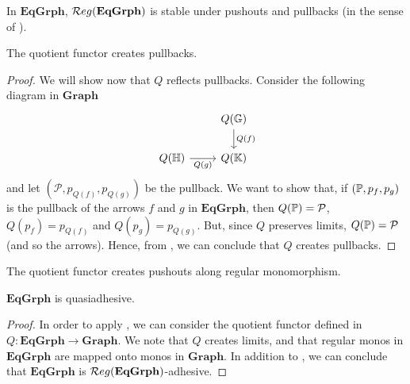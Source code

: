 \begin{lemma}\label{lemma:eqgrph_stab_po_pb}
    In $\mathbf{EqGrph}$,  $\mathcal{R}eg(\mathbf{EqGrph})$ is stable under pushouts and pullbacks (in the sense of ).
\end{lemma}


\begin{lemma}
    The quotient functor creates pullbacks.
\end{lemma}

\begin{proof}
    We will show now that $Q$ reflects pullbacks.
    Consider the following diagram in $\mathbf{Graph}$
    \[
        \begin{tikzcd}
            & Q(\eqgraph{G}) \arrow[d, "Q(f)"] \\
            Q(\eqgraph{H}) \arrow[r, "Q(g)"swap] & Q(\eqgraph{K})
        \end{tikzcd}
    \]
    and let $(\mathcal P, p_{Q(f)}, p_{Q(g)})$ be the pullback. We want to show that, if  $(\mathbb{P}, p_f, p_g)$ is the pullback of the arrows $f$ and $g$ in $\mathbf{EqGrph}$, then $Q(\mathbb{P}) = \mathcal{P}$, $Q(p_f) = p_{Q(f)}$ and $Q(p_g) = p_{Q(g)}$. But, since $Q$ preserves limits, $Q(\mathbb{P}) = \mathcal{P}$ (and so the arrows).
    Hence, from , we can conclude that $Q$ creates pullbacks.
\end{proof}

\begin{lemma}
    The quotient functor creates pushouts along regular monomorphism.
\end{lemma}


\begin{theorem}
    $\mathbf{EqGrph}$ is quasiadhesive.
\end{theorem}

\begin{proof}
    In order to apply , we can consider the quotient functor defined in  $Q: \mathbf{EqGrph \rightarrow Graph}$. We note that $Q$ creates limits, and that regular monos in $\mathbf{EqGrph}$ are mapped onto monos in $\mathbf{Graph}$. In addition to , we can conclude that $\mathbf{EqGrph}$ is $\mathcal{R}eg(\mathbf{EqGrph})$-adhesive.
\end{proof}
